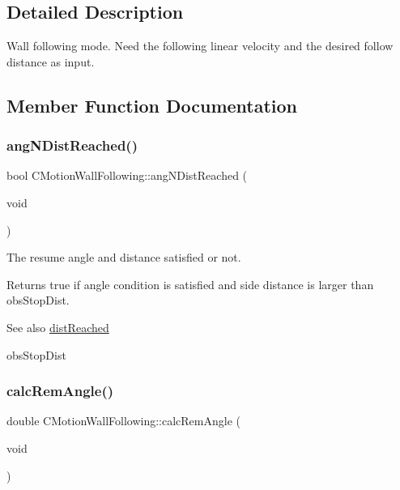 \subsection{Detailed Description}
Wall following mode. Need the following linear velocity and the desired follow distance as input. 

\subsection{Member Function Documentation}
\mbox{\label{classmotion_1_1CMotionWallFollowing_aa84fb18a4cea89ad726c18d4f308e4d7}} 
\subsubsection{\texorpdfstring{ang\+N\+Dist\+Reached()}{angNDistReached()}}
{\footnotesize\ttfamily bool C\+Motion\+Wall\+Following\+::ang\+N\+Dist\+Reached (\begin{DoxyParamCaption}\item[{void}]{ }\end{DoxyParamCaption})}

The resume angle and distance satisfied or not. \begin{DoxyReturn}{Returns}
true if angle condition is satisfied and side distance is larger than obs\+Stop\+Dist. 
\end{DoxyReturn}
\begin{DoxySeeAlso}{See also}
\mbox{\hyperlink{classmotion_1_1CMotionWallFollowing_a4fcea1525cdd043f8c0dd8621e3ba09e}{dist\+Reached}} 

obs\+Stop\+Dist 
\end{DoxySeeAlso}
\mbox{\label{classmotion_1_1CMotionWallFollowing_ad8a39e0176c9e6127b8267b1a7a891ac}} 
\subsubsection{\texorpdfstring{calc\+Rem\+Angle()}{calcRemAngle()}}
{\footnotesize\ttfamily double C\+Motion\+Wall\+Following\+::calc\+Rem\+Angle (\begin{DoxyParamCaption}\item[{void}]{ }\end{DoxyParamCaption})}

